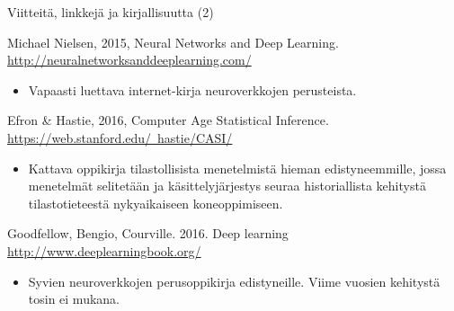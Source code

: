 \documentclass[presentation]{beamer}
\begin{document}
\begin{frame}{Viitteitä, linkkejä ja kirjallisuutta (2)}

    Michael Nielsen, 2015, Neural Networks and Deep Learning. \href{http://neuralnetworksanddeeplearning.com/}{http://neuralnetworksanddeeplearning.com/}
    \begin{itemize}
        \item Vapaasti luettava internet-kirja neuroverkkojen perusteista.
    \end{itemize}
    
    Efron & Hastie, 2016, Computer Age Statistical Inference. \href{https://web.stanford.edu/~hastie/CASI/}{https://web.stanford.edu/~hastie/CASI/}
    \begin{itemize}
        \item Kattava oppikirja tilastollisista menetelmistä hieman edistyneemmille, jossa menetelmät selitetään ja käsittelyjärjestys seuraa historiallista kehitystä tilastotieteestä nykyaikaiseen koneoppimiseen.
    \end{itemize}
    
    Goodfellow, Bengio, Courville. 2016. Deep learning \href{http://www.deeplearningbook.org/}{http://www.deeplearningbook.org/}
    \begin{itemize}
        \item Syvien neuroverkkojen perusoppikirja edistyneille. Viime vuosien kehitystä tosin ei mukana.
    \end{itemize}

\end{frame}
\end{document}

